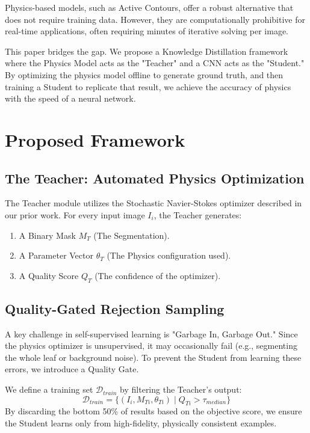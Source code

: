 \documentclass[journal]{IEEEtran}
\begin{document}
Physics-based models, such as Active Contours, offer a robust alternative that does not require training data. However, they are computationally prohibitive for real-time applications, often requiring minutes of iterative solving per image.

This paper bridges the gap. We propose a Knowledge Distillation framework where the Physics Model acts as the "Teacher" and a CNN acts as the "Student." By optimizing the physics model offline to generate ground truth, and then training a Student to replicate that result, we achieve the accuracy of physics with the speed of a neural network.

\section{Proposed Framework}

\subsection{The Teacher: Automated Physics Optimization}
The Teacher module utilizes the Stochastic Navier-Stokes optimizer described in our prior work. For every input image $I_i$, the Teacher generates:
\begin{enumerate}
    \item A Binary Mask $M_T$ (The Segmentation).
    \item A Parameter Vector $\theta_T$ (The Physics configuration used).
    \item A Quality Score $Q_T$ (The confidence of the optimizer).
\end{enumerate}

\subsection{Quality-Gated Rejection Sampling}
A key challenge in self-supervised learning is "Garbage In, Garbage Out." Since the physics optimizer is unsupervised, it may occasionally fail (e.g., segmenting the whole leaf or background noise). To prevent the Student from learning these errors, we introduce a Quality Gate.

We define a training set $\mathcal{D}_{train}$ by filtering the Teacher's output:
\begin{equation}
\mathcal{D}_{train} = \{ (I_i, M_{Ti}, \theta_{Ti}) \mid Q_{Ti} > \tau_{median} \}
\end{equation}
By discarding the bottom 50\% of results based on the objective score, we ensure the Student learns only from high-fidelity, physically consistent examples.
\end{document}
